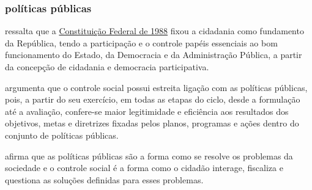 \subsubsection{políticas públicas}

\cite{tavares2022governo} ressalta que a \href{https://www.planalto.gov.br/ccivil_03/constituicao/constituicao.htm}{Constituição Federal de 1988} fixou a cidadania como fundamento da República, tendo a participação e o controle papéis essenciais ao bom funcionamento do Estado, da Democracia e da Administração Pública, a partir da concepção de cidadania e democracia participativa.

\cite{tavares2022governo} argumenta que o controle social possui estreita ligação com as políticas públicas, pois, a partir do seu exercício, em todas as etapas do ciclo, desde a formulação até a avaliação, confere-se maior legitimidade e eficiência aos resultados dos objetivos, metas e diretrizes fixadas pelos planos, programas e ações dentro do conjunto de políticas públicas.

\cite{tavares2022governo} afirma que as políticas públicas são a forma como se resolve os problemas da sociedade e o controle social é a forma como o cidadão interage, fiscaliza e questiona as soluções definidas para esses problemas. 
